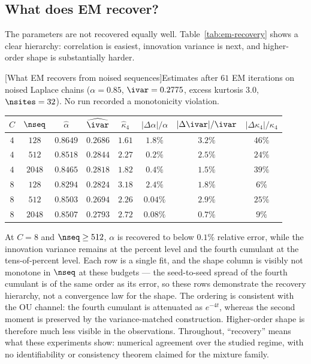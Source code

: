 \subsection{What does EM recover?}

The parameters are not recovered equally well. Table~\ref{tab:em-recovery}
shows a clear hierarchy: correlation is easiest, innovation variance is next,
and higher-order shape is substantially harder.

\begin{center}
\begin{minipage}{\linewidth}\centering
{}[What EM recovers from noised sequences]{Estimates after
$61$ EM iterations on noised Laplace chains
($\alpha=0.85$, $\ivar=0.2775$, excess kurtosis $3.0$, $\nsites=32$).
No run recorded a monotonicity violation.}
\label{tab:em-recovery}
\small
\begin{tabular}{@{}ccccc ccc@{}}
\toprule
$C$ & $\nseq$ & $\widehat\alpha$ & $\widehat\ivar$ & $\widehat\kappa_4$
& $|\Delta\alpha|/\alpha$ & $|\Delta\ivar|/\ivar$ & $|\Delta\kappa_4|/\kappa_4$ \\
\midrule
$4$ & $128$  & $0.8649$ & $0.2686$ & $1.61$ & $1.8\%$  & $3.2\%$ & $46\%$ \\
$4$ & $512$  & $0.8518$ & $0.2844$ & $2.27$ & $0.2\%$  & $2.5\%$ & $24\%$ \\
$4$ & $2048$ & $0.8465$ & $0.2818$ & $1.82$ & $0.4\%$  & $1.5\%$ & $39\%$ \\
\addlinespace
$8$ & $128$  & $0.8294$ & $0.2824$ & $3.18$ & $2.4\%$  & $1.8\%$ & $6\%$ \\
$8$ & $512$  & $0.8503$ & $0.2694$ & $2.26$ & $0.04\%$ & $2.9\%$ & $25\%$ \\
$8$ & $2048$ & $0.8507$ & $0.2793$ & $2.72$ & $0.08\%$ & $0.7\%$ & $9\%$ \\
\bottomrule
\end{tabular}
\end{minipage}
\end{center}

At $C=8$ and $\nseq\geq512$, $\alpha$ is recovered to below $0.1\%$ relative
error, while the innovation variance remains at the percent level and the
fourth cumulant at the tens-of-percent level. Each row is a single fit, and
the shape column is visibly not monotone in $\nseq$ at these budgets --- the
seed-to-seed spread of the fourth cumulant is of the same order as its error,
so these rows demonstrate the recovery hierarchy, not a convergence law for
the shape. The ordering is consistent with
the OU channel: the fourth cumulant is attenuated as $e^{-4t}$, whereas the
second moment is preserved by the variance-matched construction. Higher-order
shape is therefore much less visible in the observations. Throughout,
``recovery'' means what these experiments show: numerical agreement over the
studied regime, with no identifiability or consistency theorem claimed for
the mixture family.

